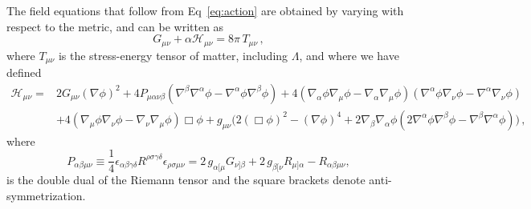 \documentclass[reprint,amsmath,amssymbGaps,onecolumn,notitlepage,nofootinbib]{revtex4-1}
\newcommand{\dal}{\Box \phi}
\newcommand{\dpp}{\left(\nabla \phi \right)^2}
\renewcommand{\a}{\alpha}
\renewcommand{\b}{\beta}
\begin{document}
The field equations that follow from Eq~\eqref{eq:action} are obtained by varying with respect to the metric, and can be written as
\begin{equation} \label{feqs0}
    G_{\mu \nu} + \alpha \mathcal{H}_{\mu \nu}=8\pi \, T_{\mu \nu}\, ,
\end{equation}
where $T_{\mu \nu}$ is the stress-energy tensor of matter, including $\Lambda$, and where we have defined
\begin{equation} \label{feqs}
\begin{aligned}
\mathcal{H}_{\mu\nu} =& 2G_{\mu \nu} \dpp+4P_{\mu \alpha \nu \beta}\left(\nabla^\beta \nabla^\alpha \phi - \nabla^\alpha \phi \nabla^\beta \phi\right) +4\left(\nabla_\a \phi \nabla_\mu \phi - \nabla_\alpha \nabla_\mu \phi\right) \left(\nabla^\a \phi \nabla_\nu \phi - \nabla^\a \nabla_\nu \phi\right)\\
&+4\left(\nabla_\mu \phi \nabla_\nu \phi - \nabla_\nu \nabla_\mu \phi\right) \dal +g_{\mu \nu} \Big(2\left(\dal\right)^2 - \left( \nabla \phi\right)^4 + 2\nabla_\b \nabla_\a\phi\left(2\nabla^\a \phi \nabla^\b \phi - \nabla^\b \nabla^\a \phi \right) \Big)\,,
\end{aligned}
\end{equation}
where%
\begin{equation*}
P_{\alpha \beta \mu \nu} \equiv \frac{1}{4} \epsilon_{\alpha \beta \gamma \delta} R^{\rho \sigma \gamma \delta} \epsilon_{\rho \sigma \mu \nu} = 2\, g_{\alpha [\mu}G_{\nu] \beta} + 2\, g_{\beta [\nu} R_{\mu] \alpha} -R_{\alpha \beta \mu \nu},
\end{equation*}
is the double dual of the Riemann tensor and the square brackets denote anti-symmetrization. 
\end{document}
